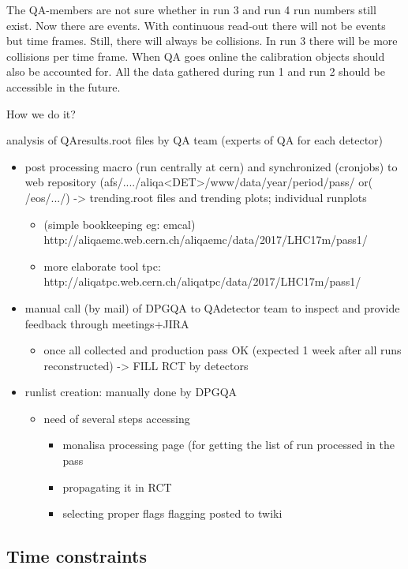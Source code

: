 The QA-members are not sure whether in run 3 and run 4 run numbers still exist. Now there are events. With continuous read-out there will not be events but time frames. Still, there will always be collisions. In run 3 there will be more collisions per time frame. When QA goes online the calibration objects should also be accounted for. All the data gathered during run 1 and run 2 should be accessible in the future.

How we do it?

analysis of QAresults.root files by QA team (experts of QA for each detector)
\begin{itemize}
  \item post processing macro (run centrally at cern) and synchronized (cronjobs) to web repository (afs/..../aliqa<DET>/www/data/year/period/pass/ or( /eos/.../) -> trending.root files and trending plots; individual runplots
  \begin{itemize}
    \item (simple bookkeeping eg: emcal) http://aliqaemc.web.cern.ch/aliqaemc/data/2017/LHC17m/pass1/
    \item more elaborate tool tpc: http://aliqatpc.web.cern.ch/aliqatpc/data/2017/LHC17m/pass1/
  \end{itemize}
  \item manual call (by mail) of DPGQA to QAdetector team to inspect and provide feedback through meetings+JIRA
  \begin{itemize}
    \item once all collected and production pass OK (expected 1 week after all runs reconstructed) -> FILL RCT by detectors
  \end{itemize}
  \item runlist creation: manually done by DPGQA
    \begin{itemize}
    \item need of several steps accessing
      \begin{itemize}
      \item monalisa processing page (for getting the list of run processed in the pass
      \item propagating it in RCT
      \item selecting proper flags flagging posted to twiki
      \end{itemize}
  \end{itemize}
\end{itemize}

\subsection{Time constraints}

